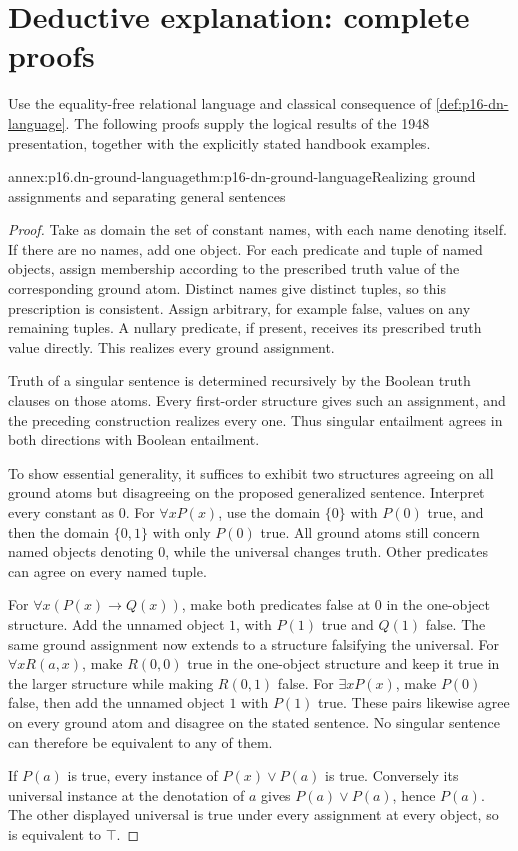 \section{Deductive explanation: complete proofs}
\label{sec:annex-p16-deductive-nomological-explanation}

Use the equality-free relational language and classical
consequence of \cref{def:p16-dn-language}.
The following proofs supply the logical results of the
1948 presentation, together with the explicitly stated
handbook examples.

\begin{annexitem}{annex:p16.dn-ground-language}{thm:p16-dn-ground-language}{Realizing ground assignments and separating general sentences}
\begin{proof}
Take as domain the set of constant names, with each
name denoting itself. If there are no names, add
one object. For each predicate and tuple of named
objects, assign membership according to the prescribed
truth value of the corresponding ground atom.
Distinct names give distinct tuples, so this prescription
is consistent. Assign arbitrary, for example false,
values on any remaining tuples. A nullary predicate,
if present, receives its prescribed truth value directly.
This realizes every ground assignment.

Truth of a singular sentence is determined recursively
by the Boolean truth clauses on those atoms.
Every first-order structure gives such an assignment,
and the preceding construction realizes every one.
Thus singular entailment agrees in both directions
with Boolean entailment.

To show essential generality, it suffices to exhibit
two structures agreeing on all ground atoms but
disagreeing on the proposed generalized sentence.
Interpret every constant as \(0\). For
\(\forall xP(x)\), use the domain \(\{0\}\)
with \(P(0)\) true, and then the domain
\(\{0,1\}\) with only \(P(0)\) true.
All ground atoms still concern named objects
denoting \(0\), while the universal changes truth.
Other predicates can agree on every named tuple.

For \(\forall x(P(x)\to Q(x))\), make both
predicates false at \(0\) in the one-object
structure. Add the unnamed object \(1\),
with \(P(1)\) true and \(Q(1)\) false.
The same ground assignment now extends to
a structure falsifying the universal.
For \(\forall xR(a,x)\), make \(R(0,0)\)
true in the one-object structure and keep
it true in the larger structure while
making \(R(0,1)\) false.
For \(\exists xP(x)\), make \(P(0)\) false,
then add the unnamed object \(1\) with
\(P(1)\) true. These pairs likewise agree
on every ground atom and disagree on
the stated sentence. No singular sentence
can therefore be equivalent to any of them.

If \(P(a)\) is true, every instance of
\(P(x)\lor P(a)\) is true. Conversely its
universal instance at the denotation of
\(a\) gives \(P(a)\lor P(a)\), hence
\(P(a)\). The other displayed universal
is true under every assignment at every
object, so is equivalent to \(\top\).
\end{proof}
\end{annexitem}

